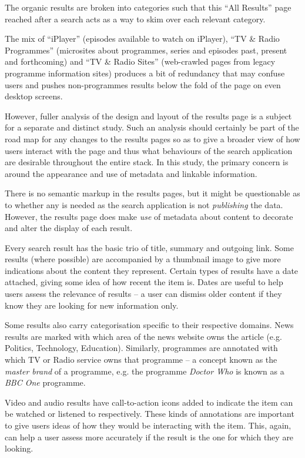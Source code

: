 The organic results are broken into categories such that this ``All Results''
page reached after a search acts as a way to skim over each relevant
category.

The mix of ``iPlayer'' (episodes available to watch on iPlayer),
``TV \& Radio Programmes'' (microsites about programmes, series
and episodes past, present and forthcoming) and ``TV \& Radio Sites''
(web-crawled pages from legacy programme information sites) produces
a bit of redundancy that may confuse users and pushes non-programmes
results below the fold of the page on even desktop screens.

However, fuller analysis of the design and layout of the results page
is a subject for a separate and distinct study. Such an analysis
should certainly be part of the road map for any changes to the
results pages so as to give a broader view of how users interact
with the page and thus what behaviours of the search application
are desirable throughout the entire stack. In this study, the
primary concern is around the appearance and use of metadata
and linkable information.

There is no semantic markup in the results pages, but it might be
questionable as to whether any is needed as the search application
is not \emph{publishing} the data. However, the results page does
make \emph{use} of metadata about content to decorate and alter
the display of each result.

Every search result has the basic trio of title, summary and outgoing
link. Some results (where possible) are accompanied by a thumbnail
image to give more indications about the content they represent. Certain
types of results have a date attached, giving some idea of how recent
the item is. Dates are useful to help users assess the relevance
of results -- a user can dismiss older content if they know they
are looking for new information only.

Some results also carry categorisation specific to their respective
domains. News results are marked with which area of the news
website owns the article (e.g. Politics, Technology, Education). Similarly,
programmes are annotated with which TV or Radio service owns
that programme -- a concept known as the \emph{master brand} of a programme,
e.g. the programme \emph{Doctor Who} is known as a \emph{BBC One} programme.

Video and audio results have call-to-action icons added to indicate
the item can be watched or listened to respectively. These kinds
of annotations are important to give users ideas of how they would
be interacting with the item. This, again, can help a user assess more
accurately if the result is the one for which they are looking.

